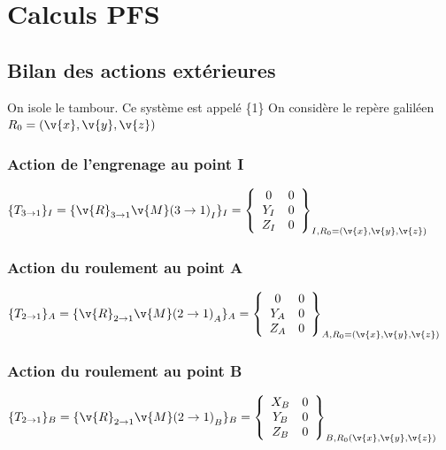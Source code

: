 \chapter{Calculs PFS}



\section{Bilan des actions extérieures}

On isole le tambour. Ce système est appelé \{1\}
On considère le repère galiléen $R_0=(\v{x}, \v{y}, \v{z})$

\subsection{Action de l'engrenage au point I}

$\{T_{3 \rightarrow 1}\}_I = \{ {\v{R}_{3 \rightarrow 1} \v{M}(3 \rightarrow 1)}_I\}_I =
\left\{ \begin{array}{ccc}
0&0\\
Y_I&0\\
Z_I&0\\
\end{array}
\right\}_{I,R_0=(\v{x}, \v{y}, \v{z})}$


\subsection{Action du roulement au point A}
$\{T_{2 \rightarrow 1}\}_A = \{ {\v{R}_{2 \rightarrow 1} \v{M}(2 \rightarrow 1)}_A\}_A =
\left\{ \begin{array}{ccc}
0&0\\
Y_A&0\\
Z_A&0\\
\end{array}
\right\}_{A,R_0=(\v{x}, \v{y}, \v{z})}
$

\subsection{Action du roulement au point B}
$\{T_{2 \rightarrow 1}\}_B = \{ {\v{R}_{2 \rightarrow 1} \v{M}(2 \rightarrow 1)}_B\}_B =
\left\{ \begin{array}{ccc}
X_B&0\\
Y_B&0\\
Z_B&0\\
\end{array}
\right\}_{B,R_0(\v{x}, \v{y}, \v{z})}
$

